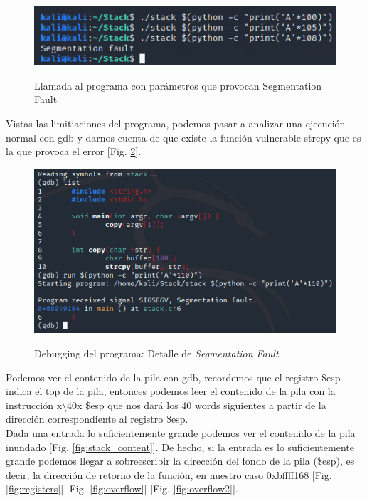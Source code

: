 \documentclass[a4paper,oneside]{article}
\begin{document}
\begin{figure}[h!]
  \centering
  \includegraphics[scale=0.7]{images/test2.png}\\
  \caption{Llamada al programa con parámetros que provocan Segmentation Fault}
  \label{fig:test2}
\end{figure}

Vistas las limitiaciones del programa, podemos pasar a analizar una ejecución normal con gdb y darnos cuenta de que existe la función vulnerable strcpy que es la que provoca el error [Fig. \ref{fig:test3}].

\begin{figure}[h!]
  \centering
  \includegraphics[scale=0.7]{images/test3.png}\\
  \caption{Debugging del programa: Detalle de \textit{Segmentation Fault}}
  \label{fig:test3}
\end{figure}

Podemos ver el contenido de la pila con gdb, recordemos que el registro \$esp indica el top de la pila, entonces podemos leer el contenido de la pila con la instrucción x\textbackslash40x \$esp que nos dará los 40 words siguientes a partir de la dirección correspondiente al registro \$esp.\\
Dada una entrada lo suficientemente grande podemos ver el contenido de la pila inundado [Fig. \ref{fig:stack_content}]. De hecho, si la entrada es lo suficientemente grande podemos llegar a sobreescribir la dirección del fondo de la pila (\$esp), es decir, la dirección de retorno de la función, en nuestro caso 0xbffff168 [Fig. \ref{fig:registers}] [Fig. \ref{fig:overflow}] [Fig. \ref{fig:overflow2}].
\end{document}
